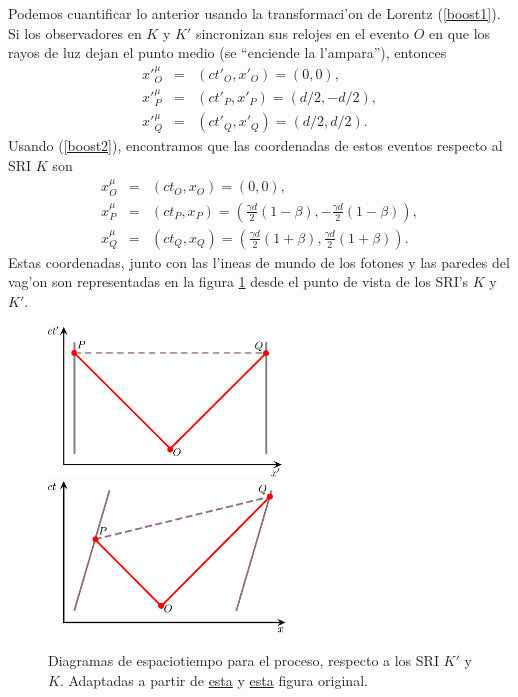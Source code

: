 Podemos cuantificar lo anterior usando la transformaci'on de Lorentz (\ref{boost1}). Si los observadores en $K$ y $K'$ sincronizan sus relojes en el evento $O$ en que los rayos de luz dejan el punto medio (se ``enciende la l'ampara''), entonces
\begin{eqnarray}
x'^\mu_O&=&(ct'_O,x'_O)=(0,0), \\
x'^\mu_P&=&(ct'_P,x'_P)=(d/2,-d/2), \\
x'^\mu_Q&=&(ct'_Q,x'_Q)=(d/2,d/2).
\end{eqnarray}
Usando (\ref{boost2}), encontramos que las coordenadas de estos eventos respecto al SRI $K$ son
\begin{eqnarray}
x^\mu_O&=&(ct_O,x_O)=(0,0), \\
x^\mu_P&=&(ct_P,x_P)=\left(\frac{\gamma d}{2}(1-\beta),-\frac{\gamma d}{2} (1-\beta)\right), \\
x^\mu_Q&=&(ct_Q,x_Q)=\left(\frac{\gamma d}{2}(1+\beta),\frac{\gamma d}{2} (1+\beta)\right).
\end{eqnarray}
Estas coordenadas, junto con las l'ineas de mundo de los fotones y las paredes del vag'on son representadas en la figura \ref{sim03-04} desde el punto de vista de los SRI's $K$ y $K'$.
\begin{figure}[!h]
\centerline{\includegraphics[height= 4cm]{fig/fig-diagrama_simultaneidad-03.pdf}\hspace{1cm}
\includegraphics[height= 4cm]{fig/fig-diagrama_simultaneidad-04.pdf}}
\caption{Diagramas de espaciotiempo para el proceso, respecto a los SRI $K'$ y $K$. Adaptadas a partir de \href{https://en.wikipedia.org/wiki/File:TrainAndPlatformDiagram1.svg}{esta} y \href{https://en.wikipedia.org/wiki/File:TrainAndPlatformDiagram2.svg}{esta} figura original.}
\label{sim03-04}
\end{figure}

